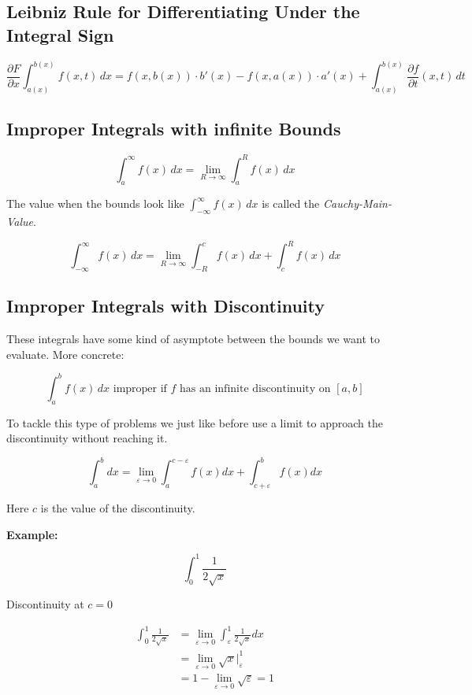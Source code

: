 \subsection{Leibniz Rule for Differentiating Under the Integral Sign}

\[
    \frac{\partial F}{\partial x} \int_{a(x)}^{b(x)} f(x, t)\,dx = f(x, b(x)) \cdot b'(x) - f(x, a(x)) \cdot a'(x) + \int_{a(x)}^{b(x)} \frac{\partial f}{\partial t}(x, t)\,dt
\]

\subsection{Improper Integrals with infinite Bounds}

\[
    \int_a^\infty f(x)\,dx = \lim_{R \to \infty} \int_a^R f(x)\,dx
\]

The value when the bounds look like \(\int_{-\infty}^\infty f(x)\,dx \) is called the \emph{Cauchy-Main-Value}.

\[
    \int_{-\infty}^\infty f(x)\,dx = \lim_{R \to \infty} \int_{-R}^{c} f(x)\,dx + \int_{c}^{R} f(x)\,dx
\]

\subsection{Improper Integrals with Discontinuity}

These integrals have some kind of asymptote between the bounds we want to evaluate.  
More concrete: 

\[
    \int_a^b f(x)\,dx \text{ improper if } f \text{ has an infinite discontinuity on } [a, b]
\]

To tackle this type of problems we just like before use a limit to approach the discontinuity without 
reaching it.

\[
    \int_{a}^{b} dx = \lim_{\varepsilon \to 0 } \int_{a}^{c - \varepsilon} f(x)dx + 
    \int_{c + \varepsilon}^{b} f(x) dx 
\]

Here \(c\) is the value of the discontinuity.

\textbf{Example:}

\[
    \int_{0}^{1} \frac{1}{2\sqrt{x}}
\]

Discontinuity at \(c = 0\)

\begin{align*}
    \int_{0}^{1} \frac{1}{2\sqrt{x}} &= \lim_{\varepsilon \to 0} \int_{\varepsilon}^{1} \frac{1}{2\sqrt{x}} dx\\
    &= \lim_{\varepsilon \to 0} \sqrt{x} |_{\varepsilon}^{1} \\
    &= 1 - \lim_{\varepsilon \to 0} \sqrt{\varepsilon} = 1
\end{align*}

